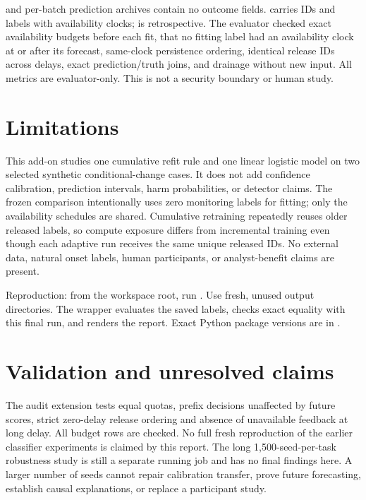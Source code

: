 \documentclass[11pt,a4paper]{article}
\begin{document}
\texttt{} and per-batch prediction archives contain no outcome fields. \texttt{} carries IDs and labels with availability clocks; \texttt{} is retrospective. The evaluator checked exact availability budgets before each fit, that no fitting label had an availability clock at or after its forecast, same-clock persistence ordering, identical release IDs across delays, exact prediction/truth joins, and drainage without new input. All metrics are evaluator-only. This is not a security boundary or human study.\par

\section{Limitations}

This add-on studies one cumulative refit rule and one linear logistic model on two selected synthetic conditional-change cases. It does not add confidence calibration, prediction intervals, harm probabilities, or detector claims. The frozen comparison intentionally uses zero monitoring labels for fitting; only the availability schedules are shared. Cumulative retraining repeatedly reuses older released labels, so compute exposure differs from incremental training even though each adaptive run receives the same unique released IDs. No external data, natural onset labels, human participants, or analyst-benefit claims are present.\par

Reproduction: from the workspace root, run \texttt{}. Use fresh, unused output directories. The wrapper evaluates the saved labels, checks exact equality with this final run, and renders the report. Exact Python package versions are in \texttt{}.\par


\section{Validation and unresolved claims}

The audit extension tests equal quotas, prefix decisions unaffected by future scores, strict zero-delay release ordering and absence of unavailable feedback at long delay. All budget rows are checked. No full fresh reproduction of the earlier classifier experiments is claimed by this report. The long 1,500-seed-per-task robustness study is still a separate running job and has no final findings here. A larger number of seeds cannot repair calibration transfer, prove future forecasting, establish causal explanations, or replace a participant study.\par
\end{document}
